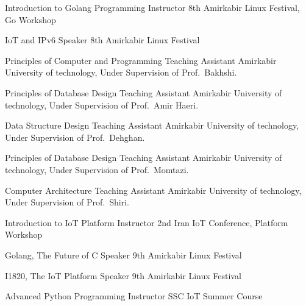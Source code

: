 \documentclass[]{friggeri-cv} %
\begin{document}
\begin{entrylist}
	{Introduction to Golang Programming}
	{Instructor}
	{8th Amirkabir Linux Festival, Go Workshop}
	

	{IoT and IPv6}
	{Speaker}
	{8th Amirkabir Linux Festival}


	{Principles of Computer and Programming}
	{Teaching Assistant}
	{Amirkabir University of technology, Under Supervision of Prof.\ Bakhshi.}


	{Principles of Database Design}
	{Teaching Assistant}
	{Amirkabir University of technology, Under Supervision of Prof.\ Amir Haeri.}

	
	{Data Structure Design}
	{Teaching Assistant}
	{Amirkabir University of technology, Under Supervision of Prof.\ Dehghan.}

	
	{Principles of Database Design}
	{Teaching Assistant}
	{Amirkabir University of technology, Under Supervision of Prof.\ Momtazi.}


	{Computer Architecture}
	{Teaching Assistant}
	{Amirkabir University of technology, Under Supervision of Prof.\ Shiri.}

	
	{Introduction to IoT Platform}
	{Instructor}
	{2nd Iran IoT Conference, Platform Workshop}


	{Golang, The Future of C}
	{Speaker}
	{9th Amirkabir Linux Festival}


	{I1820, The IoT Platform}
	{Speaker}
	{9th Amirkabir Linux Festival}


	{Advanced Python Programming}
	{Instructor}
	{SSC IoT Summer Course}


\end{entrylist}
\end{document}
